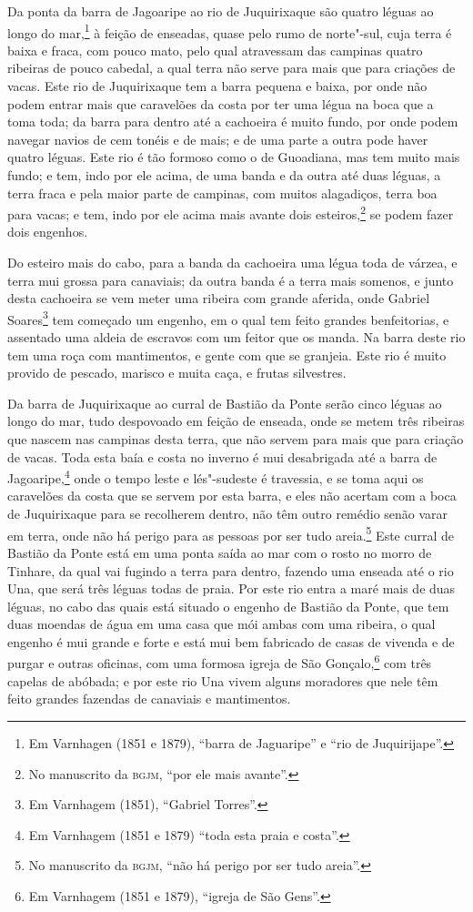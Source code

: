 Da ponta da barra de Jagoaripe ao rio de Juquirixaque são quatro léguas ao longo do
mar,\footnote{ Em Varnhagen (1851 e 1879), ``barra de Jaguaripe'' e ``rio de
Juquirijape''.} à feição de enseadas, quase pelo rumo de norte"-sul, cuja terra é baixa e
fraca, com pouco mato, pelo qual atravessam das campinas quatro ribeiras de pouco cabedal,
a qual terra não serve para mais que para criações de vacas. Este rio de Juquirixaque tem
a barra pequena e baixa, por onde não podem entrar mais que caravelões da costa por ter
uma légua na boca que a toma toda; da barra para dentro até a cachoeira é muito fundo, por
onde podem navegar navios de cem tonéis e de mais; e de uma parte a outra pode haver
quatro léguas. Este rio é tão formoso como o de Guoadiana, mas tem muito mais fundo; e
tem, indo por ele acima, de uma banda e da outra até duas léguas, a terra fraca e pela
maior parte de campinas, com muitos alagadiços, terra boa para vacas; e tem, indo por ele
acima mais avante dois esteiros,\footnote{ No manuscrito da \textsc{bgjm}, ``por ele mais
avante''.} se podem fazer dois engenhos.

Do esteiro mais do cabo, para a banda da cachoeira uma légua toda de várzea, e terra mui
grossa para canaviais; da outra banda é a terra mais somenos, e junto desta cachoeira se
vem meter uma ribeira com grande aferida, onde Gabriel Soares\footnote{ Em Varnhagem
(1851), ``Gabriel Torres''.} tem começado um engenho, em o qual tem feito grandes
benfeitorias, e assentado uma aldeia de escravos com um feitor que os manda. Na barra
deste rio tem uma roça com mantimentos, e gente com que se granjeia. Este rio é muito
provido de pescado, marisco e muita caça, e frutas silvestres.

Da barra de Juquirixaque ao curral de Bastião da Ponte serão cinco léguas ao longo do mar,
tudo despovoado em feição de enseada, onde se metem três ribeiras que nascem nas campinas
desta terra, que não servem para mais que para criação de vacas. Toda esta baía e costa no
inverno é mui desabrigada até a barra de Jagoaripe,\footnote{ Em Varnhagem (1851 e 1879)
``toda esta praia e costa''.} onde o tempo leste e lés"-sudeste é travessia, e se toma
aqui os caravelões da costa que se servem por esta barra, e eles não acertam com a boca de
Juquirixaque para se recolherem dentro, não têm outro remédio senão varar em terra, onde
não há perigo para as pessoas por ser tudo areia.\footnote{ No manuscrito da
\textsc{bgjm}, ``não há perigo por ser tudo areia''.} Este curral de Bastião da Ponte
está em uma ponta saída ao mar com o rosto no morro de Tinhare, da qual vai fugindo a
terra para dentro, fazendo uma enseada até o rio Una, que será três léguas todas de praia.
Por este rio entra a maré mais de duas léguas, no cabo das quais está situado o engenho de
Bastião da Ponte, que tem duas moendas de água em uma casa que mói ambas com uma ribeira,
o qual engenho é mui grande e forte e está mui bem fabricado de casas de vivenda e de
purgar e outras oficinas, com uma formosa igreja de São Gonçalo,\footnote{ Em Varnhagem
(1851 e 1879), ``igreja de São Gens''.} com três capelas de abóbada; e por este rio Una
vivem alguns moradores que nele têm feito grandes fazendas de canaviais e mantimentos.

